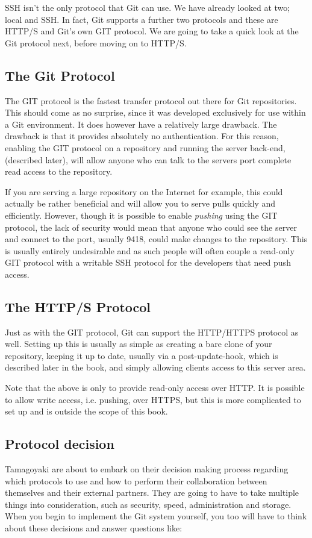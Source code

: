 SSH isn't the only protocol that Git can use.  We have already looked at two; local and SSH.  In fact, Git supports a further two protocols and these are HTTP/S and Git's own GIT protocol.  We are going to take a quick look at the Git protocol next, before moving on to HTTP/S.

\subsection{The Git Protocol}
The GIT protocol is the fastest transfer protocol out there for Git repositories.  This should come as no surprise, since it was developed exclusively for use within a Git environment.  It does however have a relatively large drawback.  The drawback is that it provides absolutely no authentication.  For this reason, enabling the GIT protocol on a repository and running the server back-end, (described later), will allow anyone who can talk to the servers port complete read access to the repository.

If you are serving a large repository on the Internet for example, this could actually be rather beneficial and will allow you to serve pulls quickly and efficiently.  However, though it is possible to enable \emph{pushing} using the GIT protocol, the lack of security would mean that anyone who could see the server and connect to the port, usually 9418, could make changes to the repository.  This is usually entirely undesirable and as such people will often couple a read-only GIT protocol with a writable SSH protocol for the developers that need push access.

\subsection{The HTTP/S Protocol}
Just as with the GIT protocol, Git can support the HTTP/HTTPS protocol as well.  Setting up this is usually as simple as creating a bare clone of your repository, keeping it up to date, usually via a post-update-hook, which is described later in the book, and simply allowing clients access to this server area.  

Note that the above is only to provide read-only access over HTTP.  It is possible to allow write access, i.e. pushing, over HTTPS, but this is more complicated to set up and is outside the scope of this book.

\subsection{Protocol decision}
Tamagoyaki are about to embark on their decision making process regarding which protocols to use and how to perform their collaboration between themselves and their external partners.  They are going to have to take multiple things into consideration, such as security, speed, administration and storage.  When you begin to implement the Git system yourself, you too will have to think about these decisions and answer questions like:

